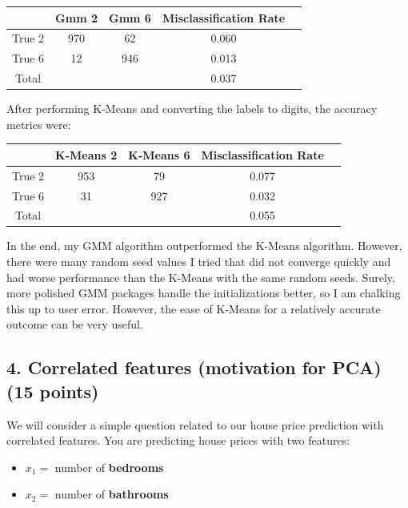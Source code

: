 \documentclass[twoside,12pt]{article}
\begin{document}
\begin{enumerate}[label*=\arabic*.]
\begin{center}
\begin{tabular}{|c|c|c|c|c|}
\hline
& Gmm 2 & Gmm 6 & Misclassification Rate\\\hline
\textsf{True 2} & 970 & 62 & 0.060\\\hline
\textsf{True 6} & 12 & 946 & 0.013\\\hline
\textsf{Total} & & & 0.037\\\hline
\end{tabular}
\end{center}

After performing K-Means and converting the labels to digits, the accuracy metrics were:
\begin{center}
\begin{tabular}{|c|c|c|c|c|}
\hline
& K-Means 2 & K-Means 6 & Misclassification Rate\\\hline
\textsf{True 2} & 953 & 79 & 0.077\\\hline
\textsf{True 6} & 31 & 927 & 0.032\\\hline
\textsf{Total} & & & 0.055\\\hline
\end{tabular}
\end{center}

In the end, my GMM algorithm outperformed the K-Means algorithm. However, there were many random seed values I tried that did not converge quickly and had worse performance than the K-Means with the same random seeds. Surely, more polished GMM packages handle the initializations better, so I am chalking this up to user error. However, the ease of K-Means for a relatively accurate outcome can be very useful.

\end{enumerate}

\subsection*{4. Correlated features (motivation for PCA) (15 points)}

We will consider a simple question related to our house price prediction with correlated features. You are predicting house prices with two features:
\begin{itemize}
    \item $x_1 =$ number of \textbf{bedrooms}
    \item $x_2 =$ number of \textbf{bathrooms}
\end{itemize}
\end{document}
